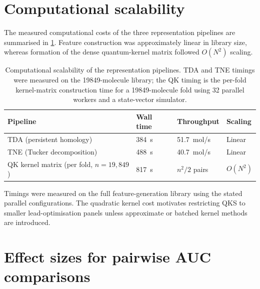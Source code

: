 \documentclass[11pt,a4paper]{article}
\begin{document}

\section{Computational scalability}
\label{sec:scalability}

The measured computational costs of the three representation pipelines are summarised in \cref{tab:scalability}. Feature construction was approximately linear in library size, whereas formation of the dense quantum-kernel matrix followed $O(N^2)$ scaling.

\begin{table}[htbp]
\centering
\caption{Computational scalability of the representation pipelines. TDA and TNE timings were measured on the \num{19849}-molecule library; the QK timing is the per-fold kernel-matrix construction time for a \num{19849}-molecule fold using 32 parallel workers and a state-vector simulator.}
\label{tab:scalability}
\begin{tabularx}{\textwidth}{l l l l}
\toprule
Pipeline & {Wall time} & {Throughput} & {Scaling} \\
\midrule
TDA (persistent homology) & \SI{384}{\second} & 51.7~mol/s & Linear \\
TNE (Tucker decomposition) & \SI{488}{\second} & 40.7~mol/s & Linear \\
QK kernel matrix (per fold, $n=19{,}849$) & \SI{817}{\second} & $n^2/2$ pairs & $O(N^2)$ \\
\bottomrule
\end{tabularx}
\vspace{1mm}
\footnotesize Timings were measured on the full feature-generation library using the stated parallel configurations. The quadratic kernel cost motivates restricting QKS to smaller lead-optimisation panels unless approximate or batched kernel methods are introduced.
\end{table}


\section{Effect sizes for pairwise AUC comparisons}
\label{sec:effect_sizes}
\end{document}
